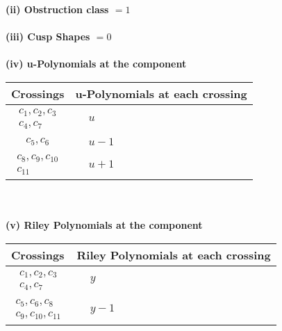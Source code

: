 \documentclass[1p]{elsarticle_modified}
\theoremstyle{definition}
\begin{document}
\flushleft \textbf{(ii) Obstruction class $= 1$}\\~\\
\flushleft \textbf{(iii) Cusp Shapes $= 0$}\\~\\
\newpage\renewcommand{\arraystretch}{1}
\flushleft \textbf{(iv) u-Polynomials at the component}\newline \\
\begin{tabular}{m{50pt}|m{274pt}}
Crossings & \hspace{64pt}u-Polynomials at each crossing \\
\hline $$\begin{aligned}c_{1},c_{2},c_{3}\\c_{4},c_{7}\end{aligned}$$&$\begin{aligned}
&u
\end{aligned}$\\
\hline $$\begin{aligned}c_{5},c_{6}\end{aligned}$$&$\begin{aligned}
&u-1
\end{aligned}$\\
\hline $$\begin{aligned}c_{8},c_{9},c_{10}\\c_{11}\end{aligned}$$&$\begin{aligned}
&u+1
\end{aligned}$\\
\hline
\end{tabular}\\~\\
\newpage\renewcommand{\arraystretch}{1}
\flushleft \textbf{(v) Riley Polynomials at the component}\newline \\
\begin{tabular}{m{50pt}|m{274pt}}
Crossings & \hspace{64pt}Riley Polynomials at each crossing \\
\hline $$\begin{aligned}c_{1},c_{2},c_{3}\\c_{4},c_{7}\end{aligned}$$&$\begin{aligned}
&y
\end{aligned}$\\
\hline $$\begin{aligned}c_{5},c_{6},c_{8}\\c_{9},c_{10},c_{11}\end{aligned}$$&$\begin{aligned}
&y-1
\end{aligned}$\\
\hline
\end{tabular}\\~\\
\end{document}
